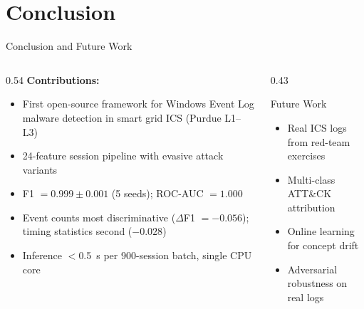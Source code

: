 \documentclass[aspectratio=169]{beamer}
\begin{document}
\section{Conclusion}

\begin{frame}{Conclusion and Future Work}
  \begin{columns}[T]
    \begin{column}{0.54\textwidth}
      \textbf{Contributions:}
      \begin{itemize}
        \small
        \item First open-source framework for Windows Event Log malware
              detection in smart grid ICS (Purdue L1--L3)
        \item 24-feature session pipeline with evasive attack variants
        \item F1 $= 0.999 \pm 0.001$ (5 seeds); ROC-AUC $= 1.000$
        \item Event counts most discriminative ($\Delta$F1 $= {-0.056}$);
              timing statistics second ($-0.028$)
        \item Inference $<$0.5~s per 900-session batch, single CPU core
      \end{itemize}
    \end{column}
    \begin{column}{0.43\textwidth}
      \begin{block}{Future Work}
        \begin{itemize}
          \small
          \item Real ICS logs from red-team exercises
          \item Multi-class ATT\&CK attribution
          \item Online learning for concept drift
          \item Adversarial robustness on real logs
        \end{itemize}
      \end{block}
    \end{column}
  \end{columns}
\end{frame}
\end{document}
